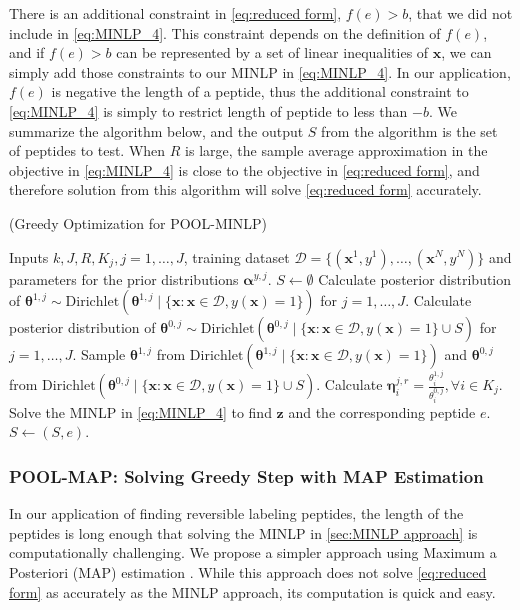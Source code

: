 There is an additional constraint in \eqref{eq:reduced form}, $f(e) > b$, that we did not include in \eqref{eq:MINLP_4}. This
constraint depends on the definition of $f(e)$, and if $f(e) > b$ can be represented by a set of linear inequalities
of $\bm{x}$, we can simply add those constraints to our MINLP in \eqref{eq:MINLP_4}. In our application, $f(e)$ is negative the length
of a peptide, thus the additional constraint to \eqref{eq:MINLP_4} is simply to restrict length of peptide to less than $-b$. 
We summarize the algorithm below, and the output $S$ from the algorithm is the set of peptides to test. When $R$ is large, the
sample average approximation in the objective in \eqref{eq:MINLP_4} is close to the objective in \eqref{eq:reduced form}, and
therefore solution from this algorithm will solve \eqref{eq:reduced form} accurately.
\begin{Algorithm}(Greedy Optimization for POOL-MINLP) \label{algo1}
\begin{algorithmic}[1]
  \REQUIRE Inputs $k, J, R, K_j, j = 1, \ldots, J$, training dataset $\mathcal{D} = 
  \{(\bm{x}^1, y^1), \ldots, (\bm{x}^N, y^N)\}$ and parameters for the prior 
  distributions $\bm{\alpha}^{y, j}$.
  \STATE $S \leftarrow \emptyset $
  \STATE Calculate posterior distribution of $\bm{\theta}^{1, j} \sim 
  \text{Dirichlet} (\bm{\theta}^{1, j} \mid \{\bm{x}: \bm{x} \in \mathcal{D}, 
  y(\bm{x}) = 1\})$ for $j = 1, \ldots, J$.
    \STATE Calculate posterior distribution of $\bm{\theta}^{0, j} \sim 
    \text{Dirichlet} (\bm{\theta}^{0, j} \mid \{\bm{x}: \bm{x} \in \mathcal{D}, 
    y(\bm{x}) = 1\} \cup S)$ for $j = 1, \ldots, J$.
          \STATE Sample $\bm{\theta}^{1, j}$ from $\text{Dirichlet} (\bm{\theta}^{1, j} 
          \mid \{\bm{x}: \bm{x} \in \mathcal{D}, y(\bm{x}) = 1\})$ and $\bm{\theta}^{0, j}$
          from $\text{Dirichlet} (\bm{\theta}^{0, j} \mid \{\bm{x}: \bm{x} \in \mathcal{D}, 
          y(\bm{x}) = 1\} \cup S)$.
          \STATE Calculate $\bm{\eta}^{j, r}_i = \frac{\theta^{1, j}_i}{\theta^{0, j}_i}, \forall i \in K_j$.
      \ENDFOR
    \ENDFOR
    \STATE Solve the MINLP in \eqref{eq:MINLP_4} to find $\bm{z}$ and the corresponding peptide $e$.
    \STATE $S \leftarrow (S, e)$.
  \ENDFOR
\end{algorithmic}
\end{Algorithm}

\subsubsection{POOL-MAP: Solving Greedy Step with MAP Estimation} \label{sec:MAP approach}
In our application of finding reversible labeling peptides, the length of the peptides is long enough that solving the MINLP 
in \ref{sec:MINLP approach} is computationally challenging. We propose a simpler approach using Maximum a Posteriori (MAP) estimation
\citep{trove.nla.gov.au/work/9892361}. 
While this approach does not solve \eqref{eq:reduced form} as accurately as the MINLP approach, its computation is quick and easy. 

